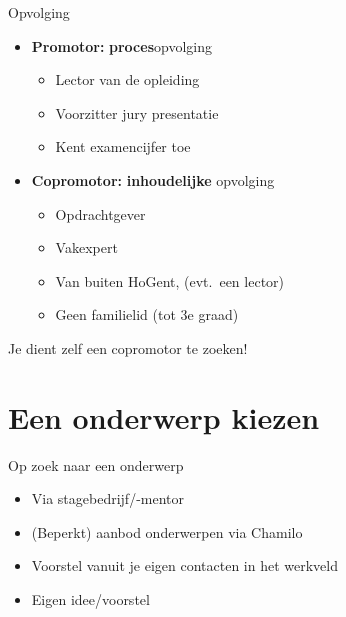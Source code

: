 \documentclass[aspectratio=169]{beamer}
\begin{document}
\begin{frame}{Opvolging}

  \begin{itemize}
    \item \textbf{Promotor:} \textbf{proces}opvolging
          \begin{itemize}
            \item Lector van de opleiding
            \item Voorzitter jury presentatie
            \item Kent examencijfer toe
          \end{itemize}
    \item \textbf{Copromotor:} \textbf{inhoudelijke} opvolging
          \begin{itemize}
            \item Opdrachtgever
            \item Vakexpert
            \item Van buiten HoGent, (evt.\ een lector)
            \item Geen familielid (tot 3e graad)
          \end{itemize}
  \end{itemize}

  \bigskip

  Je dient zelf een copromotor te zoeken!

\end{frame}

\section{Een onderwerp kiezen}

\begin{frame}{Op zoek naar een onderwerp}

  \begin{itemize}
    \item Via stagebedrijf/-mentor
    \item (Beperkt) aanbod onderwerpen via Chamilo
    \item Voorstel vanuit je eigen contacten in het werkveld
    \item Eigen idee/voorstel
  \end{itemize}

  \bigskip

\end{frame}
\end{document}
